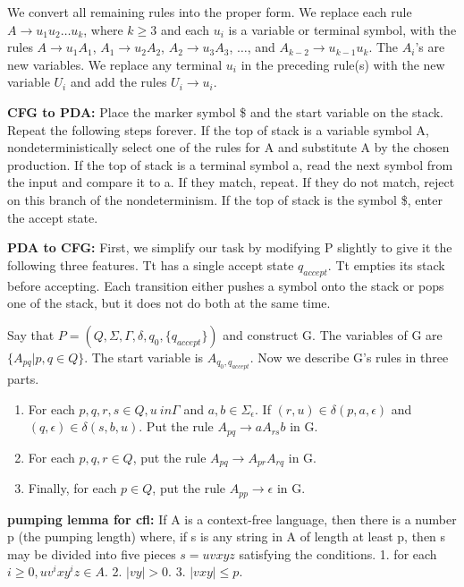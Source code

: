 \documentclass[12pt]{article}
\begin{document}
We convert all remaining rules into the proper form. We replace each rule $A \rightarrow u_1u_2 \dots u_k$, where $k \geq 3$ and each $u_i$ is a variable or terminal symbol, with the rules $A \rightarrow u_1A_1$, $A_1 \rightarrow u_2A_2$, $A_2 \rightarrow u_3A_3$, $\dots$, and $A_{k-2} \rightarrow u_{k-1}u_k$. The $A_i$'s are new variables. We replace any terminal $u_i$ in the preceding rule(s) with the new variable $U_i$ and add the rules $U_i \rightarrow u_i$.

\textbf{CFG to PDA:} Place the marker symbol \$ and the start variable on the stack. Repeat the following steps forever. If the top of stack is a variable symbol A, nondeterministically select one of the rules for A and substitute A by the chosen production. If the top of stack is a terminal symbol a, read the next symbol from the input and compare it to a. If they match, repeat. If they do not match, reject on this branch of the nondeterminism. If the top of stack is the symbol \$, enter the accept state.

\textbf{PDA to CFG:} First, we simplify our task by modifying P slightly to give it the following three features. Tt has a single accept state $q_{accept}$. Tt empties its stack before accepting. Each transition either pushes a symbol onto the stack or pops one of the stack, but it does not do both at the same time.

Say that $P = (Q,\Sigma,\Gamma,\delta,q_0,\{q_{accept}\})$ and construct G. The variables of G are $\{A_{pq}|p,q \in Q\}$. The start variable is $A_{q_0,q_{accept}}$. Now we describe G's rules in three parts.

\begin{enumerate}
        \item For each $p,q,r,s \in Q, u \ in \Gamma$ and $a,b \in \Sigma_\epsilon$. If $(r,u) \in \delta(p,a,\epsilon)$ and $(q,\epsilon) \in \delta(s,b,u)$. Put the rule $A_{pq} \rightarrow aA_{rs}b$ in G.
        \item For each $p,q,r \in Q$, put the rule $A_{pq} \rightarrow A_{pr}A_{rq}$ in G.
        \item Finally, for each $p \in Q$, put the rule $A_{pp} \rightarrow \epsilon$ in G.
\end{enumerate}

\textbf{pumping lemma for cfl:} If A is a context-free language, then there is a number p (the pumping length) where, if s is any string in A of length at least p, then s may be divided into five pieces $s = uvxyz$ satisfying the conditions. 1. for each $i \geq 0, uv^ixy^iz \in A$. 2. $|vy| > 0$. 3. $|vxy| \leq p$.
\end{document}
